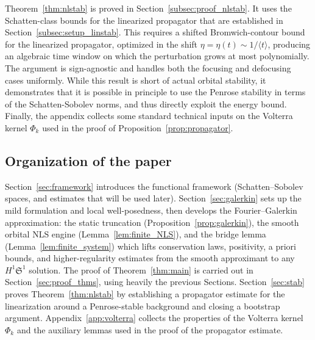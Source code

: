 \documentclass[11pt]{amsart}
\theoremstyle{definition}
\newtheorem{remark}[theorem]{Remark}
\newcommand{\Sp}{\mathfrak{S}}
\begin{document}
\smallskip 

Theorem~\ref{thm:nlstab} is proved in Section~\ref{subsec:proof_nlstab}. It uses the Schatten-class bounds for the linearized propagator that are established in Section~\ref{subsec:setup_linstab}. This requires a shifted Bromwich-contour bound for the linearized propagator, optimized in the shift $\eta=\eta(t)\sim 1/\langle t\rangle$, producing an algebraic time window on which the perturbation grows at most polynomially. The argument is sign-agnostic and handles both the focusing and defocusing cases uniformly. While this result is short of actual orbital stability, it demonstrates that it is possible in principle to use the Penrose stability in terms of the Schatten-Sobolev norms, and thus directly exploit  the energy bound.
Finally, the appendix collects some standard technical inputs on the Volterra kernel $\Phi_k$ used in the proof of Proposition~\ref{prop:propagator}.



\subsection{Organization of the paper}
Section~\ref{sec:framework} introduces the functional framework (Schatten--Sobolev spaces, and estimates that will be used later). Section~\ref{sec:galerkin} sets up the mild formulation and local well-posedness, then develops the Fourier--Galerkin approximation: the static truncation (Proposition~\ref{prop:galerkin}), the smooth orbital NLS engine (Lemma~\ref{lem:finite_NLS}), and the bridge lemma (Lemma~\ref{lem:finite_system}) which lifts conservation laws, positivity, a priori bounds, and higher-regularity estimates from the smooth approximant to any $H^1\Sp^1$ solution. The proof of Theorem~\ref{thm:main} is carried out in Section~\ref{sec:proof_thms}, using heavily the previous Sections. Section~\ref{sec:stab} proves Theorem~\ref{thm:nlstab} by establishing a propagator estimate for the linearization around a Penrose-stable background and closing a bootstrap argument. Appendix~\ref{app:volterra} collects the properties of the Volterra kernel $\Phi_k$ and the auxiliary lemmas used in the proof of the propagator estimate.
\end{document}

